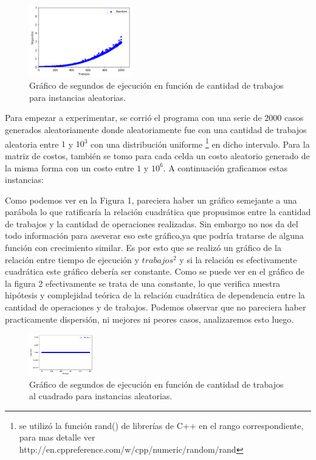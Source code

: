 \documentclass[A4paper,oneside,fleqn,11pt]{article}
\theoremstyle{definition}
\begin{document}
\begin{figure}
\centering
\includegraphics[width=0.4\textwidth]{r.png}
\caption{ Gráfico de segundos de ejecución en función de cantidad de trabajos para instancias aleatorias.}
\end{figure}
Para empezar a experimentar, se corrió el programa con una serie de $2000$ casos generados aleatoriamente donde aleatoriamente fue con una cantidad de trabajos aleatoria entre $1$ y $10^3$  con una distribución uniforme 
\footnote{ se utilizó la función rand() de librerías de C++ en el rango correspondiente, para mas detalle ver http://en.cppreference.com/w/cpp/numeric/random/rand }
en dicho intervalo. Para la matriz de costos, también se tomo para cada celda un costo aleatorio generado de la misma forma con un costo entre $1$ y $10^6$. A continuación graficamos estas instancias:



Como podemos ver en la Figura 1, pareciera haber un gráfico semejante a una parábola lo que ratificaría la relación cuadrática que propusimos entre la cantidad de trabajos y la cantidad de operaciones realizadas. Sin embargo no nos da del todo información para aseverar eso este gráfico,ya que podría tratarse de alguna función con crecimiento similar. Es por esto que se realizó un gráfico de la relación entre tiempo de ejecución y $trabajos^2$ y si la relación es efectivamente cuadrática este gráfico debería ser constante. Como se puede ver en el gráfico de la figura 2 efectivamente se trata de una constante, lo que verifica nuestra hipótesis y complejidad teórica de la relación cuadrática de dependencia entre la cantidad de operaciones y de trabajos. Podemos observar que no pareciera haber practicamente dispersión, ni mejores ni peores casos, analizaremos esto luego.

\break

\begin{figure}
\centering
\includegraphics[width=0.25\textwidth]{Escuad.png}
\caption{ Gráfico de segundos de ejecución en función de cantidad de trabajos al cuadrado para instancias aleatorias.}
\end{figure}
\end{document}
